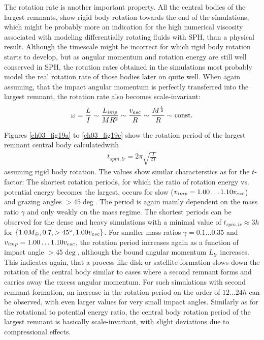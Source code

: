 The rotation rate is another important property. All the central bodies of the largest remnants, show rigid body rotation towards the end of the simulations, which might be probably more an indication for the high numerical viscosity associated with modeling differentially rotating fluids with SPH, than a physical result. Although the timescale might be incorrect for which rigid body rotation starts to develop, but as angular momentum and rotation energy are still well conserved in SPH, the rotation rates obtained in the simulations most probably model the real rotation rate of those bodies later on quite well. When again assuming, that the impact angular momentum is perfectly transferred into the largest remnant, the rotation rate also becomes scale-invariant:
\begin{align}
\omega = \frac{L}{I} \sim \frac{L_{imp}}{M R^2} \sim \frac{v_{esc}}{R} \sim \frac{M^{\frac{1}{3}}}{R} \sim \mathrm{const.}
\end{align} 

Figures \ref{ch03_fig19a} to \ref{ch03_fig19c} show the rotation period of the largest remnant central body calculatedwith 
\begin{align}
t_{spin, lr} = 2 \pi \sqrt{ \frac{I}{2 T} }
\end{align}
assuming rigid body rotation. The values show similar characterstics as for the $t$-factor: The shortest rotation periods, for which the ratio of rotation energy vs. potential energy becomes the largest, occurs for slow ($v_{imp} = 1.00 \dots 1.10 v_{esc}$) and grazing angles $> 45 \deg$. The period is again mainly dependent on the mass ratio $\gamma$ and only weakly on the mass regime. The shortest periods can be observed for the dense and heavy \css simulations with a minimal value of $t_{spin, lr} \approx 3h$ for $\{1.0 M_{\oplus}, 0.7, > 45 ^\circ, 1.00 v_{esc} \}$. For smaller mass ratios $\gamma = 0.1 \dots 0.35$ and $v_{imp} = 1.00 \dots 1.10 v_{esc}$, the rotation period increases again as a function of impact angle $> 45 \deg$, although the bound angular momentum $L_{lr}$ increases. This indicates again, that a process like disk or satellite formation slows down the rotation of the central body similar to cases where a second remnant forms and carries away the excess angular momentum. For such simulations with second remnant formation, an increase in the rotation period on the order of $12 \dots 24h$ can be observed, with even larger values for very small impact angles. Similarly as for the rotational to potential energy ratio, the central body rotation period of the largest remnant is basically scale-invariant, with slight deviations due to compressional effects.

